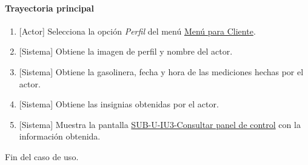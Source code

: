 \paragraph{Trayectoria principal}
	\begin{enumerate}
		\item {[Actor]} Selecciona la opción \textit{Perfil} del menú \hyperref[fig:menu-cliente]{Menú para Cliente}.
		\item {[Sistema]} Obtiene la imagen de perfil y nombre del actor.
		\item {[Sistema]} Obtiene la gasolinera, fecha y hora de las mediciones hechas por el actor.
		\item {[Sistema]} Obtiene las insignias obtenidas por el actor.
		\item {[Sistema]} Muestra la pantalla \hyperref[fig:sub-u-iu3]{SUB-U-IU3-Consultar panel de control} con la información obtenida.
	\end{enumerate}
	Fin del caso de uso.


